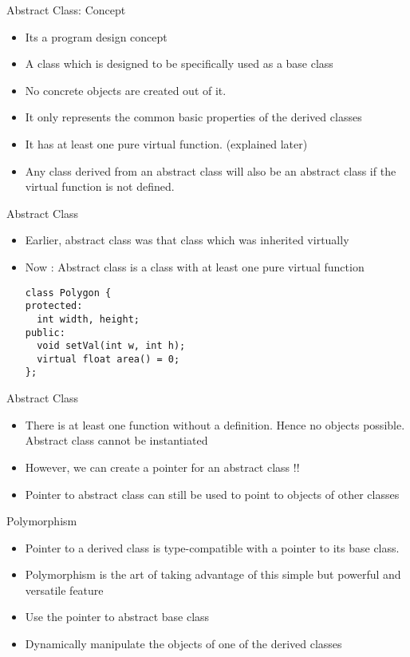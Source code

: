 \documentclass{beamer}
\begin{document}
\begin{frame}[fragile]{Abstract Class: Concept}
  \begin{itemize}
  \item Its a program design concept\pause
  \item A class which is designed to be specifically used as a base class\pause
  \item No concrete objects are created out of it.\pause
  \item It only represents the common basic properties of the derived classes\pause
  \item It has at least one pure virtual function. (explained later)\pause
  \item Any class derived from an abstract class will also be an abstract class if the virtual function is not defined.
  \end{itemize}
\end{frame}

\begin{frame}[fragile]{Abstract Class}
  \begin{itemize}
  \item Earlier, abstract class was that class which was inherited virtually\pause
  \item Now : Abstract class is a class with at least one pure virtual function\pause
    \begin{lstlisting}
class Polygon {
protected:
  int width, height;
public:
  void setVal(int w, int h);
  virtual float area() = 0;
};
    \end{lstlisting}
  \end{itemize}
\end{frame}

\begin{frame}[fragile]{Abstract Class}
  \begin{itemize}
  \item There is at least one function without a definition. Hence no objects possible. Abstract class cannot be instantiated\pause
  \item However, we can create a pointer for an abstract class !!\pause
  \item Pointer to abstract class can still be used to point to objects of other classes
  \end{itemize}
\end{frame}

\begin{frame}[fragile]{Polymorphism}
  \begin{itemize}
  \item Pointer to a derived class is type-compatible with a pointer to its base class. \pause
  \item Polymorphism is the art of taking advantage of this simple but powerful and versatile feature\pause
  \item Use the pointer to abstract base class\pause
  \item Dynamically manipulate the objects of one of the derived classes
  \end{itemize}
\end{frame}
\end{document}
